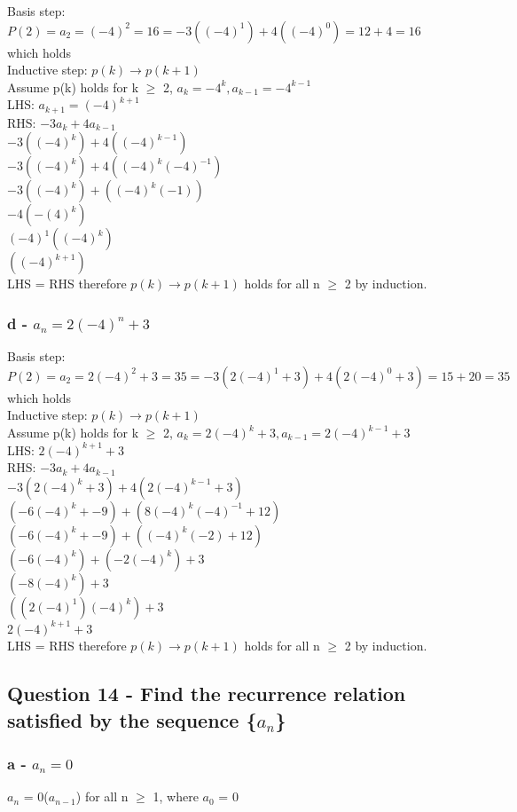 \documentclass{article}
\begin{document}
Basis step:
$P(2) = a_2 = (-4)^2 = 16 = -3((-4)^1) + 4((-4)^0) = 12 + 4 = 16$ which holds\\
Inductive step:
$p(k) \to p(k+1)$\\
Assume p(k) holds for k $\geq$ 2, $a_k = -4^k, a_{k-1} = -4^{k-1}$\\
LHS: $a_{k+1} = (-4)^{k+1}$\\
RHS: $-3{a_k} + 4a_{k-1}$\\
$-3{((-4)^k)} + 4{((-4)^{k-1})}$\\
$-3{((-4)^k)} + 4{((-4)^{k}(-4)^{-1})}$\\
$-3{((-4)^k)} + {((-4)^{k}(-1))}$\\
$-4{(-(4)^k)}$\\
$(-4)^{1}{((-4)^k)}$\\
${((-4)^{k+1})}$\\
LHS = RHS therefore $p(k) \to p(k+1)$ holds for all n $\geq$ 2 by induction.

\subsubsection[d]{d - $a_n = 2(-4)^n + 3$}
Basis step:
$P(2) = a_2 = 2(-4)^2 + 3 = 35 = -3(2(-4)^1 + 3) + 4(2(-4)^0 + 3) = 15 + 20 = 35$ which holds\\
Inductive step:
$p(k) \to p(k+1)$\\
Assume p(k) holds for k $\geq$ 2, $a_k = 2(-4)^k + 3, a_{k-1} = 2(-4)^{k-1} + 3$\\
LHS: $2(-4)^{k+1} + 3$\\
RHS: $-3{a_k} + 4a_{k-1}$\\
$-3{(2(-4)^k + 3)} + 4{(2(-4)^{k-1} + 3)}$\\
${(-6(-4)^k + -9)} + {(8(-4)^{k}(-4)^{-1} + 12)}$\\
${(-6(-4)^k + -9)} + {((-4)^{k}(-2) + 12)}$\\
${(-6(-4)^k)} + {(-2(-4)^{k}) + 3}$\\
${(-8(-4)^k)} + 3$\\
${((2(-4)^1)(-4)^k)} + 3$\\
${2(-4)^{k+1}} + 3$\\
LHS = RHS therefore $p(k) \to p(k+1)$ holds for all n $\geq$ 2 by induction.

\subsection{Question 14 - Find the recurrence relation satisfied by the sequence \{$a_n$\}}
\subsubsection[a]{a - $a_n = 0$}
$a_n$ = 0($a_{n-1}$) for all n $\geq$ 1, where $a_0$ = 0\\
\end{document}
